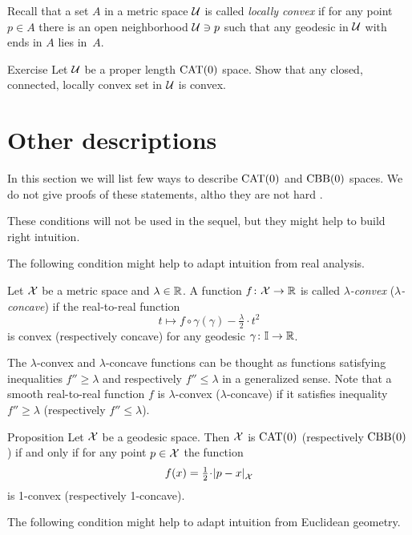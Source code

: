 Recall that a set $A$ in a metric space $\mathcal{U}$ is called \emph{locally convex} if for any point $p\in A$ there is an open neighborhood $\mathcal{U}\ni p$ such that any geodesic in $\mathcal{U}$ with  ends in $A$ lies in~$A$. 

\begin{thm}{Exercise}\label{ex:locally-convex}
Let $\mathcal{U}$ be a proper length $\mathrm{CAT}(0)$ space.
Show that any closed, connected, locally convex set in $\mathcal{U}$ is convex.
\end{thm}



\section{Other descriptions}

In this section we will list few ways to describe $\mathrm{CAT}(0)$ and $\mathrm{CBB}(0)$ spaces.
We do not give proofs of these statements, altho they are not hard \cite[see][ and the references therein]{alexander-kapovitch-petrunin-2025}.

These conditions will not be used in the sequel, but they might help to build right intuition.  

The following condition might help to adapt intuition from real analysis.

Let $\mathcal{X}$ be a metric space and $\lambda\in\mathbb{R}$.
A function $f\colon\mathcal{X}\to \mathbb{R}$ is called \emph{$\lambda$-convex} (\emph{$\lambda$-concave}) if 
the real-to-real function 
\[t\mapsto f\circ\gamma(\gamma)-\tfrac{\lambda}{2}\cdot t^2\] 
is convex (respectively concave)
for any geodesic $\gamma\colon\mathbb{I}\to \mathbb{R}$.

The $\lambda$-convex  and $\lambda$-concave functions can be thought as functions satisfying inequalities $f''\ge\lambda$ and respectively $f''\le\lambda$ in a generalized sense.
Note that a smooth real-to-real function $f$ is $\lambda$-convex ($\lambda$-concave) if it satisfies inequality $f''\ge\lambda$ (respectively $f''\le\lambda$).

\begin{thm}{Proposition}
Let $\mathcal{X}$ be a geodesic space.
Then $\mathcal{X}$ is $\mathrm{CAT}(0)$ (respectively $\mathrm{CBB}(0)$) if and only if for any point $p\in \mathcal{X}$ the function
\[f(x)=\tfrac12\cdot\dist{p}{x}{\spc{X}}\]
is 1-convex (respectively 1-concave).
\end{thm}

The following condition might help to adapt intuition from Euclidean geometry.


